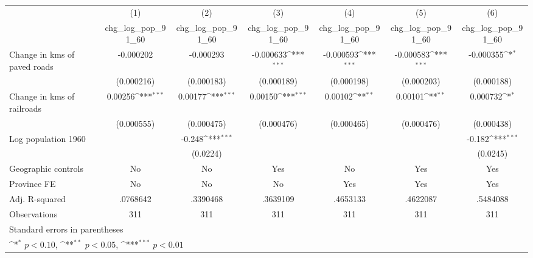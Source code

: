 {
\def\sym#1{\ifmmode^{#1}\else\(^{#1}\)\fi}
\begin{tabular}{l*{6}{c}}
\hline\hline
                    &\multicolumn{1}{c}{(1)}&\multicolumn{1}{c}{(2)}&\multicolumn{1}{c}{(3)}&\multicolumn{1}{c}{(4)}&\multicolumn{1}{c}{(5)}&\multicolumn{1}{c}{(6)}\\
                    &\multicolumn{1}{c}{chg\_log\_pop\_91\_60}&\multicolumn{1}{c}{chg\_log\_pop\_91\_60}&\multicolumn{1}{c}{chg\_log\_pop\_91\_60}&\multicolumn{1}{c}{chg\_log\_pop\_91\_60}&\multicolumn{1}{c}{chg\_log\_pop\_91\_60}&\multicolumn{1}{c}{chg\_log\_pop\_91\_60}\\
\hline
Change in kms of paved roads&   -0.000202         &   -0.000293         &   -0.000633\sym{***}&   -0.000593\sym{***}&   -0.000583\sym{***}&   -0.000355\sym{*}  \\
                    &  (0.000216)         &  (0.000183)         &  (0.000189)         &  (0.000198)         &  (0.000203)         &  (0.000188)         \\
[1em]
Change in kms of railroads&     0.00256\sym{***}&     0.00177\sym{***}&     0.00150\sym{***}&     0.00102\sym{**} &     0.00101\sym{**} &    0.000732\sym{*}  \\
                    &  (0.000555)         &  (0.000475)         &  (0.000476)         &  (0.000465)         &  (0.000476)         &  (0.000438)         \\
[1em]
Log population 1960 &                     &      -0.248\sym{***}&                     &                     &                     &      -0.182\sym{***}\\
                    &                     &    (0.0224)         &                     &                     &                     &    (0.0245)         \\
\hline
Geographic controls &          No         &          No         &         Yes         &          No         &         Yes         &         Yes         \\
Province FE         &          No         &          No         &          No         &         Yes         &         Yes         &         Yes         \\
Adj. R-squared      &    .0768642         &    .3390468         &    .3639109         &    .4653133         &    .4622087         &    .5484088         \\
Observations        &         311         &         311         &         311         &         311         &         311         &         311         \\
\hline\hline
\multicolumn{7}{l}{\footnotesize Standard errors in parentheses}\\
\multicolumn{7}{l}{\footnotesize \sym{*} \(p<0.10\), \sym{**} \(p<0.05\), \sym{***} \(p<0.01\)}\\
\end{tabular}
}
